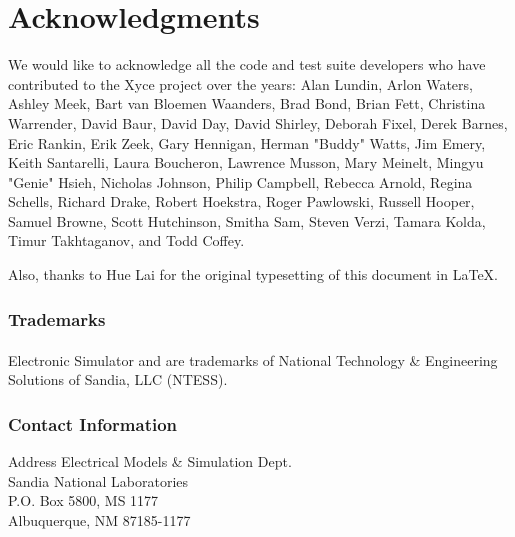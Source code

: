 


\chapter*{Acknowledgments}

We would like to acknowledge all the code and test suite developers who have
contributed to the Xyce project over the years: 
Alan Lundin,
Arlon Waters,
Ashley Meek,
Bart van Bloemen Waanders,
Brad Bond,
Brian Fett,
Christina Warrender,
David Baur,
David Day,
David Shirley,
Deborah Fixel,
Derek Barnes,
Eric Rankin,
Erik Zeek,
Gary Hennigan,
Herman "Buddy" Watts,
Jim Emery,
Keith Santarelli,
Laura Boucheron,
Lawrence Musson,
Mary Meinelt,
Mingyu \mbox{"Genie"} Hsieh,
Nicholas Johnson,
Philip Campbell,
Rebecca Arnold,
Regina Schells,
Richard Drake,
Robert Hoekstra,
Roger Pawlowski,
Russell Hooper,
Samuel Browne,
Scott Hutchinson,
Smitha Sam,
Steven Verzi,
Tamara Kolda,
Timur Takhtaganov, and
Todd Coffey.

\noindent
Also, thanks to Hue Lai for the original typesetting of this document in \LaTeX.

\subsection*{Trademarks}

\Xyce{} Electronic Simulator\textsuperscript{\scriptsize{\texttrademark}} and
\XyceTM{} are trademarks of National Technology \& Engineering Solutions of
Sandia, LLC (NTESS).

\subsection*{Contact Information} \label{Contact Information}

\begin{flushright}
Address \hfill Electrical Models \& Simulation Dept.\\
     Sandia National Laboratories\\
     P.O. Box 5800, MS 1177\\
     Albuquerque, NM 87185-1177 \\
\end{flushright}

